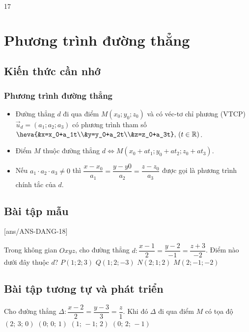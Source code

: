 \setcounter {section} {17}
\setcounter{ex}{0}
\section{Phương trình đường thẳng}
\subsection{Kiến thức cần nhớ}
\begin{khung}
	\subsubsection{Phương trình đường thẳng}
	\begin{itemize}
		\item Đường thẳng $d$ đi qua điểm $M(x_0;y_0;z_0)$ và có véc-tơ chỉ phương (VTCP) $\vec{u}_d=(a_1;a_2;a_3)$ có phương trình tham số $\heva{&x=x_0+a_1t\\&y=y_0+a_2t\\&z=z_0+a_3t},\, ( t\in \mathbb{R})$.
		\item Điểm $M$ thuộc đường thẳng $d\Leftrightarrow M(x_0+at_1;y_0+at_2;z_0+at_3)$.
		\item Nếu $a_1\cdot a_2\cdot a_3 \ne 0$ thì $\dfrac{x-x_0}{a_1}=\dfrac{y-y0}{a_2}=\dfrac{z-z_0}{a_3}$ được gọi là phương trình chính tắc của $d$. 
	\end{itemize}
\end{khung}
\subsection{Bài tập mẫu}
[ans/ANS-DANG-18]
\begin{khung}
	\begin{vd}%
		Trong không gian $O x y z$, cho đường thẳng $d: \dfrac{x-1}{2}=\dfrac{y-2}{-1}=\dfrac{z+3}{-2}$. Điểm nào dưới đây thuộc $d$?
		\choice
		{$P(1; 2; 3)$}
		{\True $Q(1; 2;-3)$}
		{$N(2; 1; 2)$}
		{$M(2;-1;-2)$}
	\end{vd}
\end{khung}
\subsection{Bài tập tương tự và phát triển}
\begin{ex}%
	Cho đường thẳng $\Delta\colon\dfrac{x-2}{2}=\dfrac{y-3}{3}=\dfrac{z}{1}$. Khi đó $\Delta $ đi qua điểm $ M$ có tọa độ
	\choice
	{\True $\left(2;\,3;\,0\right)$}
	{$\left(0;\,0;\,1\right)$}
	{$\left(1;\,-1;\,2\right)$}
	{$\left(0;\,2;\,-1\right)$}
\end{ex}

